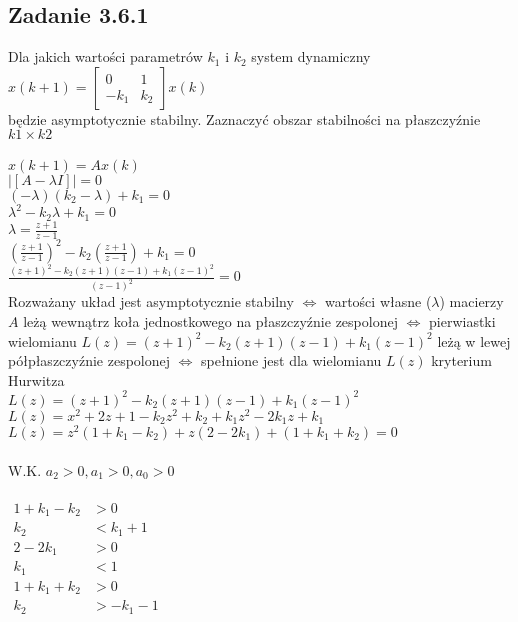 \pagebreak
\subsection*{Zadanie 3.6.1} {\color{darkgray}
	Dla jakich wartości parametrów $k_1$ i $k_2$ system dynamiczny\\
	$x(k+1)=\left[ \begin{array}{cc}     0&1\\-k_1&k_2    \end{array}\right]x(k)$\\
	będzie asymptotycznie stabilny. Zaznaczyć obszar stabilności na płaszczyźnie $k1 \times k2$
}\\\\
$x(k+1)=Ax(k)$\\
$| [A-\lambda I] | =0$\\
$(-\lambda)(k_2-\lambda)+k_1=0$\\
$\lambda^2-k_2\lambda+k_1=0$\\
$\lambda=\frac{z+1}{z-1}$\\
$(\frac{z+1}{z-1})^2-k_2(\frac{z+1}{z-1})+k_1=0$\\
$\frac{(z+1)^2-k_2(z+1)(z-1)+k_1(z-1)^2}{(z-1)^2}=0$\\
Rozważany układ jest asymptotycznie stabilny $\Leftrightarrow$ wartości własne ($\lambda$) macierzy $A$ leżą wewnątrz koła jednostkowego na płaszczyźnie zespolonej $\Leftrightarrow$ pierwiastki wielomianu $L(z)=(z+1)^2-k_2(z+1)(z-1)+k_1(z-1)^2$
leżą w lewej półpłaszczyźnie zespolonej $\Leftrightarrow$ spełnione jest dla wielomianu $L(z)$ kryterium Hurwitza\\
$L(z)=(z+1)^2-k_2(z+1)(z-1)+k_1(z-1)^2$\\
$L(z)=x^2+2z+1-k_2z^2+k_2+k_1z^2-2k_1z+k_1$\\
$L(z)=z^2(1+k_1-k_2)+z(2-2k_1)+(1+k_1+k_2)=0$\\
\\
W.K. $a_2>0, a_1>0, a_0>0$\\
\\
$\begin{array}{rl}    
	1+k_1-k_2&>0\\
	k_2&<k_1+1\\
	2-2k_1&>0\\
	k_1&<1\\
	1+k_1+k_2&>0\\
	k_2&>-k_1-1
\end{array}$\\
